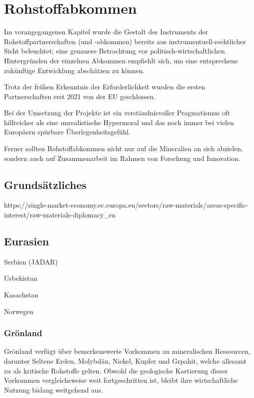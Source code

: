 \documentclass[12pt,a4paper,oneside]{book} %
\begin{document}
\section{Rohstoffabkommen}
Im vorangegangenen Kapitel wurde die Gestalt des Instruments der Rohstoffpartnerschaften (und -abkommen) bereits aus instrumentuell-rechtlicher Sicht beleuchtet; eine genauere Betrachtung vor politisch-wirtschaftlichen Hintergründen der einzelnen Abkommen empfiehlt sich, um eine entsprechene zukünftige Entwicklung abschätzen zu können.

Trotz der frühen Erkenntnis der Erforderlichkeit wurden die ersten Partnerschaften erst 2021 von der EU geschlossen.

\glqq Bei der Umsetzung der Projekte ist ein verständnisvoller Pragmatismus oft hilfreicher als eine unrealistische Hypermoral und das noch immer bei vielen Europäern spürbare Überlegenheitsgefühl.\grqq \autocite{https://www.africa-business-guide.de/de/praxis/erfahrungen/schluesselrolle-afrikas-bedeutung-bei-den-kritischen-rohstoffen--1920084}

Ferner sollten Rohstoffabkommen nicht nur auf die Mineralien an sich abzielen, sondern auch auf Zusammenarbeit im Rahmen von Forschung und Innovation.\autocite{ÖAW}

\subsection{Grundsätzliches}

https://single-market-economy.ec.europa.eu/sectors/raw-materials/areas-specific-interest/raw-materials-diplomacy_en

\subsection{Eurasien}

Serbien (JADAR)

Usbekistan

Kasachstan

Norwegen

\subsubsection{Grönland}

Grönland verfügt über bemerkenswerte Vorkommen an mineralischen Ressourcen, darunter Seltene Erden, Molybdän, Nickel, Kupfer und Grpahit, welche allesamt zu als kritische Rohstoffe gelten. Obwohl die geologische Kartierung dieser Vorkommen vergleichsweise weit fortgeschritten ist, bleibt ihre wirtschaftliche Nutzung bislang weitgehend aus.
\end{document}
